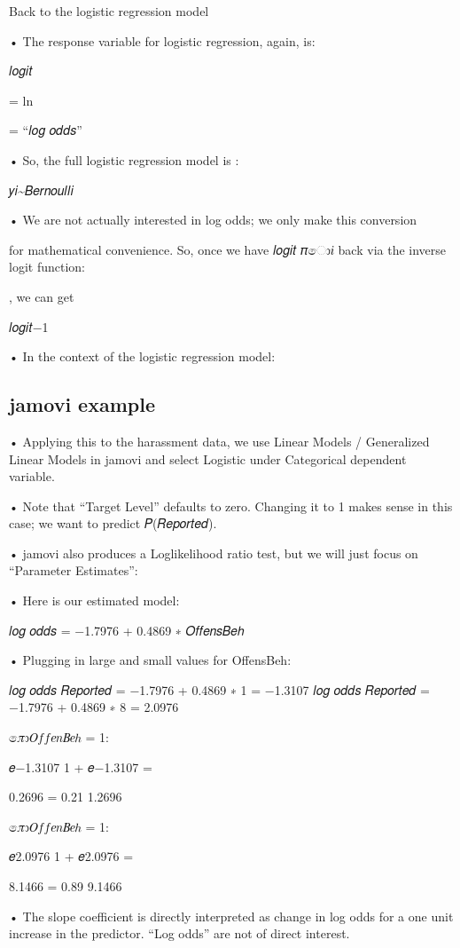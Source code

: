 \documentclass[
  letterpaper,
  DIV=11,
  numbers=noendperiod]{scrreprt}
\begin{document}
Back to the logistic regression model

• The response variable for logistic regression, again, is:

𝑙𝑜𝑔𝑖𝑡

= ln

= ``𝑙𝑜𝑔 𝑜𝑑𝑑𝑠''

• So, the full logistic regression model is :

𝑦𝑖\textasciitilde 𝐵𝑒𝑟𝑛𝑜𝑢𝑙𝑙𝑖

• We are not actually interested in log odds; we only make this
conversion

for mathematical convenience. So, once we have 𝑙𝑜𝑔𝑖𝑡 𝜋ො𝑖 back via the
inverse logit function:

, we can get

𝑙𝑜𝑔𝑖𝑡−1

• In the context of the logistic regression model:

\hypertarget{jamovi-example}{%
\subsection{jamovi example}\label{jamovi-example}}

• Applying this to the harassment data, we use Linear Models /
Generalized Linear Models in jamovi and select Logistic under
Categorical dependent variable.

• Note that ``Target Level'' defaults to zero. Changing it to 1 makes
sense in this case; we want to predict 𝑃(𝑅𝑒𝑝𝑜𝑟𝑡𝑒𝑑).

• jamovi also produces a Loglikelihood ratio test, but we will just
focus on ``Parameter Estimates'':

• Here is our estimated model:

𝑙𝑜𝑔 𝑜𝑑𝑑𝑠 = −1.7976 + 0.4869 ∗ 𝑂𝑓𝑓𝑒𝑛𝑠𝐵𝑒ℎ

• Plugging in large and small values for OffensBeh:

𝑙𝑜𝑔 𝑜𝑑𝑑𝑠 𝑅𝑒𝑝𝑜𝑟𝑡𝑒𝑑 = −1.7976 + 0.4869 ∗ 1 = −1.3107 𝑙𝑜𝑔 𝑜𝑑𝑑𝑠 𝑅𝑒𝑝𝑜𝑟𝑡𝑒𝑑 =
−1.7976 + 0.4869 ∗ 8 = 2.0976

𝜋ො\textbar 𝑂𝑓𝑓𝑒𝑛𝐵𝑒ℎ = 1:

𝑒−1.3107 1 + 𝑒−1.3107 =

0.2696 = 0.21 1.2696

𝜋ො\textbar 𝑂𝑓𝑓𝑒𝑛𝐵𝑒ℎ = 1:

𝑒2.0976 1 + 𝑒2.0976 =

8.1466 = 0.89 9.1466

• The slope coefficient is directly interpreted as change in log odds
for a one unit increase in the predictor. ``Log odds'' are not of direct
interest.
\end{document}

